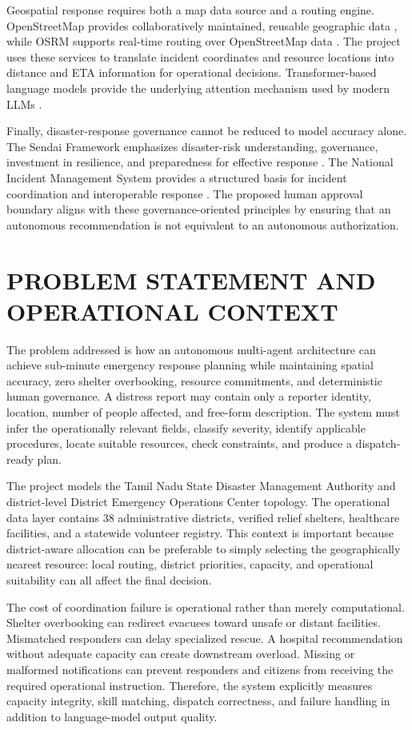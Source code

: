 \documentclass[conference]{IEEEtran}
\begin{document}
Geospatial response requires both a map data source and a routing engine. OpenStreetMap provides collaboratively maintained, reusable geographic data \cite{b9}, while OSRM supports real-time routing over OpenStreetMap data \cite{b10}. The project uses these services to translate incident coordinates and resource locations into distance and ETA information for operational decisions. Transformer-based language models provide the underlying attention mechanism used by modern LLMs \cite{b11}.

Finally, disaster-response governance cannot be reduced to model accuracy alone. The Sendai Framework emphasizes disaster-risk understanding, governance, investment in resilience, and preparedness for effective response \cite{b12}. The National Incident Management System provides a structured basis for incident coordination and interoperable response \cite{b13}. The proposed human approval boundary aligns with these governance-oriented principles by ensuring that an autonomous recommendation is not equivalent to an autonomous authorization.

\section{PROBLEM STATEMENT AND OPERATIONAL CONTEXT}
The problem addressed is how an autonomous multi-agent architecture can achieve sub-minute emergency response planning while maintaining spatial accuracy, zero shelter overbooking, resource commitments, and deterministic human governance. A distress report may contain only a reporter identity, location, number of people affected, and free-form description. The system must infer the operationally relevant fields, classify severity, identify applicable procedures, locate suitable resources, check constraints, and produce a dispatch-ready plan.

The project models the Tamil Nadu State Disaster Management Authority and district-level District Emergency Operations Center topology. The operational data layer contains 38 administrative districts, verified relief shelters, healthcare facilities, and a statewide volunteer registry. This context is important because district-aware allocation can be preferable to simply selecting the geographically nearest resource: local routing, district priorities, capacity, and operational suitability can all affect the final decision.

The cost of coordination failure is operational rather than merely computational. Shelter overbooking can redirect evacuees toward unsafe or distant facilities. Mismatched responders can delay specialized rescue. A hospital recommendation without adequate capacity can create downstream overload. Missing or malformed notifications can prevent responders and citizens from receiving the required operational instruction. Therefore, the system explicitly measures capacity integrity, skill matching, dispatch correctness, and failure handling in addition to language-model output quality.
\end{document}
